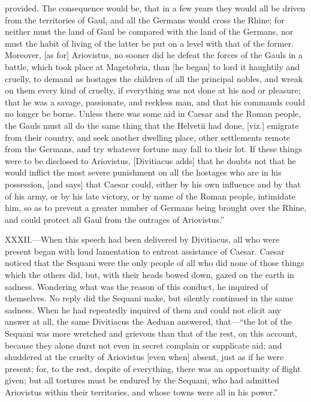provided. The consequence would be, that in a few years they would all
be driven from the territories of Gaul, and all the Germans would cross
the Rhine; for neither must the land of Gaul be compared with the land
of the Germans, nor must the habit of living of the latter be put on a
level with that of the former. Moreover, [as for] Ariovistus, no sooner
did he defeat the forces of the Gauls in a battle, which took place at
Magetobria, than [he began] to lord it haughtily and cruelly, to demand
as hostages the children of all the principal nobles, and wreak on them
every kind of cruelty, if everything was not done at his nod or
pleasure; that he was a savage, passionate, and reckless man, and that
his commands could no longer be borne. Unless there was some aid in
Caesar and the Roman people, the Gauls must all do the same thing that
the Helvetii had done, [viz.] emigrate from their country, and seek
another dwelling place, other settlements remote from the Germans, and
try whatever fortune may fall to their lot. If these things were to be
disclosed to Ariovistus, [Divitiacus adds] that he doubts not that he
would inflict the most severe punishment on all the hostages who are in
his possession, [and says] that Caesar could, either by his own
influence and by that of his army, or by his late victory, or by name of
the Roman people, intimidate him, so as to prevent a greater number of
Germans being brought over the Rhine, and could protect all Gaul from
the outrages of Ariovistus.''

XXXII.—When this speech had been delivered by Divitiacus, all who were
present began with loud lamentation to entreat assistance of Caesar.
Caesar noticed that the Sequani were the only people of all who did none
of those things which the others did, but, with their heads bowed down,
gazed on the earth in sadness. Wondering what was the reason of this
conduct, he inquired of themselves. No reply did the Sequani make, but
silently continued in the same sadness. When he had repeatedly
inquired of them and could not elicit any answer at all, the same
Divitiacus the Aeduan answered, that—``the lot of the Sequani was more
wretched and grievous than that of the rest, on this account, because
they alone durst not even in secret complain or supplicate aid; and
shuddered at the cruelty of Ariovistus [even when] absent, just as if he
were present; for, to the rest, despite of everything, there was an
opportunity of flight given; but all tortures must be endured by the
Sequani, who had admitted Ariovistus within their territories, and whose
towns were all in his power.''

